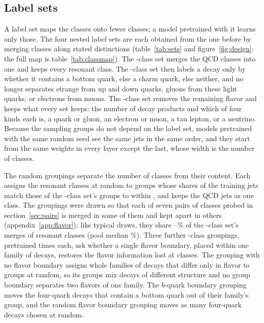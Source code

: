 \subsection{Label sets}\label{sec:labelsets}
A label set maps the \Kfull{} classes onto fewer classes; a model pretrained with it learns only those.
The four nested label sets are each obtained from the one before by merging classes along stated distinctions
(table~\ref{tab:sets} and figure~\ref{fig:design}; the full map is table~\ref{tab:classmap}).
The \Kres-class set merges the QCD classes into one and keeps every resonant class.
The \Kmid-class set then labels a decay only by whether it contains a bottom quark, else a charm quark, else neither,
and no longer separates strange from up and down quarks, gluons from these light quarks, or electrons from muons.
The \Kcoarse-class set removes the remaining flavor and keeps what every set keeps: the number of decay products and
which of four kinds each is, a quark or gluon, an electron or muon, a tau lepton, or a neutrino.
Because the sampling groups do not depend on the label set, models pretrained with the same random seed see the same
jets in the same order, and they start from the same weights in every layer except the last, whose width is the
number of classes.
%

The random groupings separate the number of classes from their content.
Each assigns the \LitJetClassTwoNResonantClasses{} resonant classes at random to \RandVtwoNResGroups{} groups whose
shares of the training jets match those of the \Kcoarse-class set's groups to within \RandVtwoShareTol, and keeps the
QCD jets as one class.
The \VRandWord{} groupings were drawn so that each of seven pairs of classes probed in section~\ref{sec:pairs} is merged
in some of them and kept apart in others (appendix~\ref{app:flavor}); like typical draws, they share
\RevPoolOverlapLoPct--\RevPoolOverlapHiPct\% of the \Kcoarse-class set's merges of resonant classes (pool median
\RevPoolOverlapMedianPct\%).
Three further \Kcoarse-class groupings, pretrained \RandFlavRuns{} times each, ask whether a single flavor boundary,
placed within one family of decays, restores the flavor information lost at \Kcoarse{} classes.
The grouping with no flavor boundary assigns whole families of decays that differ only in flavor to groups at random,
so its groups mix decays of different structure and no group boundary separates two flavors of one family.
The $b$-quark boundary grouping moves the four-quark decays that contain a bottom quark out of their family's group,
and the random flavor boundary grouping moves as many four-quark decays chosen at random.

